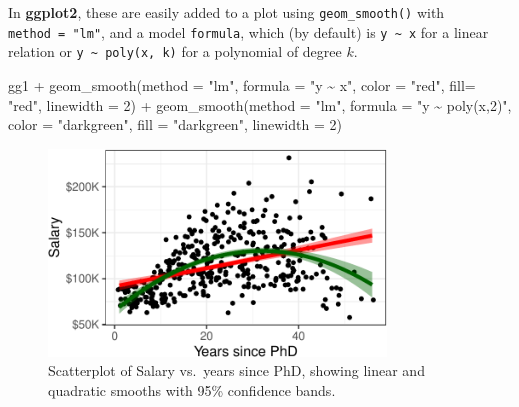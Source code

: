 \documentclass[
  letterpaper,
  10pt,
  krantz2]{krantz}
\makeatletter
\newenvironment{Shaded}{\begin{snugshade}}{\end{snugshade}}
\newcommand{\AttributeTok}[1]{\textcolor[rgb]{0.40,0.45,0.13}{#1}}
\newcommand{\DecValTok}[1]{\textcolor[rgb]{0.68,0.00,0.00}{#1}}
\newcommand{\FunctionTok}[1]{\textcolor[rgb]{0.28,0.35,0.67}{#1}}
\newcommand{\NormalTok}[1]{\textcolor[rgb]{0.00,0.23,0.31}{#1}}
\newcommand{\SpecialCharTok}[1]{\textcolor[rgb]{0.37,0.37,0.37}{#1}}
\newcommand{\StringTok}[1]{\textcolor[rgb]{0.13,0.47,0.30}{#1}}
\newenvironment{kframe}{%
  \medskip{}
  \setlength{\fboxsep}{.8em}
  \def\at@end@of@kframe{}%
  \ifinner\ifhmode%
  \def\at@end@of@kframe{\end{minipage}}%
  \begin{minipage}{\columnwidth}%
  \fi\fi%
  \def\FrameCommand##1{\hskip\@totalleftmargin \hskip-\fboxsep
  \colorbox{shadecolor}{##1}\hskip-\fboxsep
      \hskip-\linewidth \hskip-\@totalleftmargin \hskip\columnwidth}%
  \MakeFramed {\advance\hsize-\width
    \@totalleftmargin\z@ \linewidth\hsize
    \@setminipage}}%
{\par\unskip\endMakeFramed%
  \at@end@of@kframe}
\renewenvironment{Shaded}{\begin{kframe}}{\end{kframe}}
\makeatother
\begin{document}
In \textbf{ggplot2}, these are easily added to a plot using
\texttt{geom\_smooth()} with \texttt{method\ =\ "lm"}, and a model
\texttt{formula}, which (by default) is \texttt{y\ \textasciitilde{}\ x}
for a linear relation or \texttt{y\ \textasciitilde{}\ poly(x,\ k)} for
a polynomial of degree \(k\).

\begin{Shaded}
\begin{Highlighting}[]
\NormalTok{gg1 }\SpecialCharTok{+} 
  \FunctionTok{geom\_smooth}\NormalTok{(}\AttributeTok{method =} \StringTok{"lm"}\NormalTok{, }\AttributeTok{formula =} \StringTok{"y \textasciitilde{} x"}\NormalTok{, }
              \AttributeTok{color =} \StringTok{"red"}\NormalTok{, }\AttributeTok{fill=} \StringTok{"red"}\NormalTok{,}
              \AttributeTok{linewidth =} \DecValTok{2}\NormalTok{) }\SpecialCharTok{+}
  \FunctionTok{geom\_smooth}\NormalTok{(}\AttributeTok{method =} \StringTok{"lm"}\NormalTok{, }\AttributeTok{formula =} \StringTok{"y \textasciitilde{} poly(x,2)"}\NormalTok{, }
              \AttributeTok{color =} \StringTok{"darkgreen"}\NormalTok{, }\AttributeTok{fill =} \StringTok{"darkgreen"}\NormalTok{,}
              \AttributeTok{linewidth =} \DecValTok{2}\NormalTok{) }
\end{Highlighting}
\end{Shaded}

\begin{figure}[H]

{\centering \includegraphics[width=0.8\textwidth,height=\textheight]{figs/ch03/fig-Salaries-lm-1.pdf}

}

\caption{\label{fig-Salaries-lm}Scatterplot of Salary vs.~years since
PhD, showing linear and quadratic smooths with 95\% confidence bands.}

\end{figure}
\end{document}
